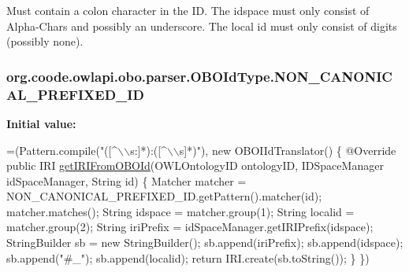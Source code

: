 Must contain a colon character in the I\-D. The idspace must only consist of Alpha-\/\-Chars and possibly an underscore. The local id must only consist of digits (possibly none). \hypertarget{enumorg_1_1coode_1_1owlapi_1_1obo_1_1parser_1_1_o_b_o_id_type_a5f0b56aac9ad13b720adf15dd688141c}{
\subsubsection[{N\-O\-N\-\_\-\-C\-A\-N\-O\-N\-I\-C\-A\-L\-\_\-\-P\-R\-E\-F\-I\-X\-E\-D\-\_\-\-I\-D}]{\setlength{\rightskip}{0pt plus 5cm}org.\-coode.\-owlapi.\-obo.\-parser.\-O\-B\-O\-Id\-Type.\-N\-O\-N\-\_\-\-C\-A\-N\-O\-N\-I\-C\-A\-L\-\_\-\-P\-R\-E\-F\-I\-X\-E\-D\-\_\-\-I\-D}}\label{enumorg_1_1coode_1_1owlapi_1_1obo_1_1parser_1_1_o_b_o_id_type_a5f0b56aac9ad13b720adf15dd688141c}
{\bfseries Initial value\-:}
\begin{DoxyCode}
=(Pattern.compile(\textcolor{stringliteral}{"([^\(\backslash\)\(\backslash\)s:]*):([^\(\backslash\)\(\backslash\)s]*)"}), \textcolor{keyword}{new} OBOIIdTranslator() \{
        @Override
        \textcolor{keyword}{public} IRI \hyperlink{enumorg_1_1coode_1_1owlapi_1_1obo_1_1parser_1_1_o_b_o_id_type_a20861c514a5d45763ad0e6da65cd04c0}{getIRIFromOBOId}(OWLOntologyID ontologyID, IDSpaceManager idSpaceManager, 
      String \textcolor{keywordtype}{id}) \{
            Matcher matcher = NON\_CANONICAL\_PREFIXED\_ID.getPattern().matcher(\textcolor{keywordtype}{id});
            matcher.matches();
            String idspace = matcher.group(1);
            String localid = matcher.group(2);
            String iriPrefix = idSpaceManager.getIRIPrefix(idspace);
            StringBuilder sb = \textcolor{keyword}{new} StringBuilder();
            sb.append(iriPrefix);
            sb.append(idspace);
            sb.append(\textcolor{stringliteral}{"#\_"});
            sb.append(localid);
            \textcolor{keywordflow}{return} IRI.create(sb.toString());
        \}
    \})
\end{DoxyCode}
